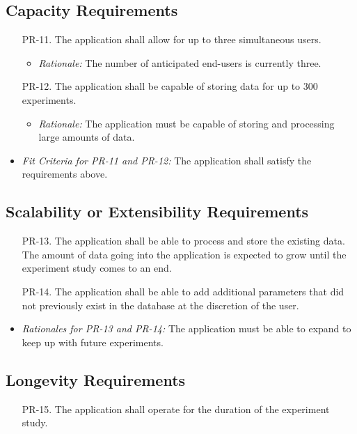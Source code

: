 \documentclass[12pt]{article}
\begin{document}
\subsection{Capacity Requirements}
\begin{enumerate}
  \item[PR-11.] The application shall allow for up to three simultaneous users.
    \begin{itemize}
      \item \textit{Rationale:} The number of anticipated end-users is currently three.
    \end{itemize}
  \item[PR-12.] The application shall be capable of storing data for up to 300 experiments.
    \begin{itemize}
      \item \textit{Rationale:} The application must be capable of storing and processing large amounts of data.
    \end{itemize}
\end{enumerate}
\begin{itemize}
  \item \textit{Fit Criteria for PR-11 and PR-12:} The application shall satisfy the requirements above.
\end{itemize}

\subsection{Scalability or Extensibility Requirements}
\begin{enumerate}
  \item[PR-13.] The application shall be able to process and store the existing data. The amount of data going into the application is expected to grow until the experiment study comes to an end.
  \item[PR-14.] The application shall be able to add additional parameters that did not previously exist in the database at the discretion of the user.
\end{enumerate}
\begin{itemize}
  \item \textit{Rationales for PR-13 and PR-14:} The application must be able to expand to keep up with future experiments.
\end{itemize}

\subsection{Longevity Requirements}
\begin{enumerate}
  \item[PR-15.] The application shall operate for the duration of the experiment study.
\end{enumerate}
\end{document}

